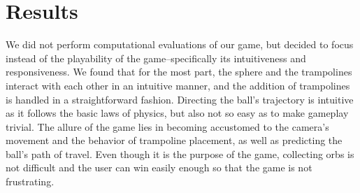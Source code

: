 \documentclass[a4paper]{article}
\begin{document}
\section{Results}
We did not perform computational evaluations of our game, but decided to focus instead of the playability of the game--specifically its intuitiveness and responsiveness. We found that for the most part, the sphere and the trampolines interact with each other in an intuitive manner, and the addition of trampolines is handled in a straightforward fashion. Directing the ball's trajectory is intuitive as it follows the basic laws of physics, but also not so easy as to make gameplay trivial. The allure of the game lies in becoming accustomed to the camera's movement and the behavior of trampoline placement, as well as predicting the ball's path of travel. Even though it is the purpose of the game, collecting orbs is not difficult and the user can win easily enough so that the game is not frustrating.
\end{document}
